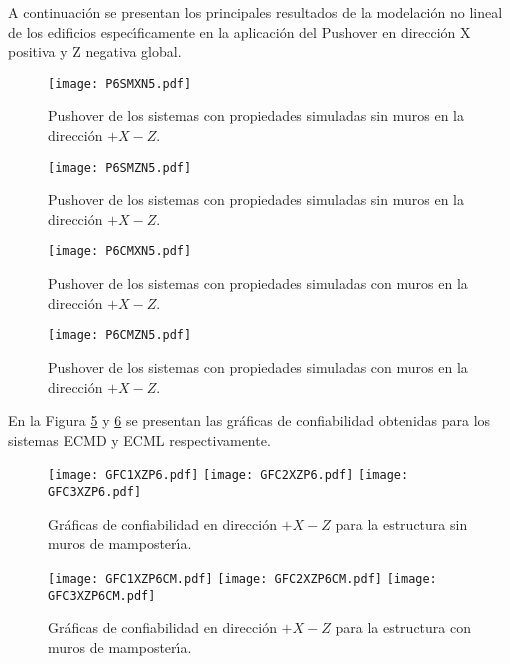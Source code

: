 A continuaci\'on se presentan los principales resultados de la modelaci\'on no lineal de los edificios espec\'{\i}ficamente en la aplicaci\'on del Pushover en direcci\'on X positiva y Z negativa global.

\begin{figure} [htbp]
\texttt{[image: P6SMXN5.pdf]}
\caption{Pushover de los sistemas con propiedades simuladas sin muros en la direcci\'on $+X-Z$.}
\label{fig:apu49}
\end{figure}

\begin{figure} [htbp]
\texttt{[image: P6SMZN5.pdf]}
\caption{Pushover de los sistemas con propiedades simuladas sin muros en la direcci\'on $+X-Z$.}
\label{fig:apu50}
\end{figure}

\begin{figure} [htbp]
\texttt{[image: P6CMXN5.pdf]}
\caption{Pushover de los sistemas con propiedades simuladas con muros en la direcci\'on $+X-Z$.}
\label{fig:apu51}
\end{figure}

\begin{figure} [htbp]
\texttt{[image: P6CMZN5.pdf]}
\caption{Pushover de los sistemas con propiedades simuladas con muros en la direcci\'on $+X-Z$.}
\label{fig:apu52}
\end{figure}

En la Figura \ref{fig:apu53} y \ref{fig:apu54} se presentan las gr\'aficas de confiabilidad obtenidas para los sistemas ECMD y ECML respectivamente.

\newpage

\begin{figure} [htbp]
\centering
\texttt{[image: GFC1XZP6.pdf]}
\texttt{[image: GFC2XZP6.pdf]}
\texttt{[image: GFC3XZP6.pdf]}
\caption{Gr\'aficas de confiabilidad en direcci\'on $+X-Z$ para la estructura sin muros de mamposter\'{\i}a.}
\label{fig:apu53}
\end{figure}

\begin{figure} [htbp]
\centering
\texttt{[image: GFC1XZP6CM.pdf]}
\texttt{[image: GFC2XZP6CM.pdf]}
\texttt{[image: GFC3XZP6CM.pdf]}
\caption{Gr\'aficas de confiabilidad en direcci\'on $+X-Z$ para la estructura con muros de mamposter\'{\i}a.}
\label{fig:apu54}
\end{figure}

